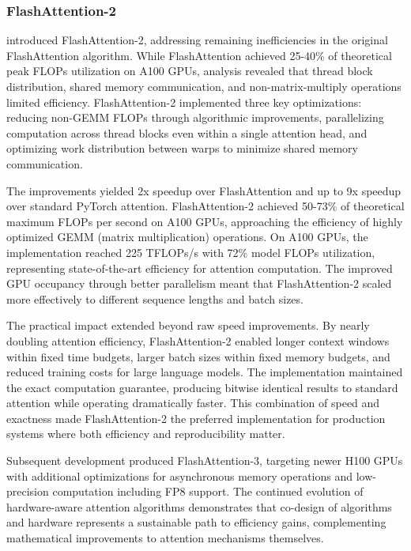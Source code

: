 \subsubsection{FlashAttention-2}

\citet{dao2023flashattention2} introduced FlashAttention-2, addressing remaining inefficiencies in the original FlashAttention algorithm. While FlashAttention achieved 25-40\% of theoretical peak FLOPs utilization on A100 GPUs, analysis revealed that thread block distribution, shared memory communication, and non-matrix-multiply operations limited efficiency. FlashAttention-2 implemented three key optimizations: reducing non-GEMM FLOPs through algorithmic improvements, parallelizing computation across thread blocks even within a single attention head, and optimizing work distribution between warps to minimize shared memory communication.

The improvements yielded 2x speedup over FlashAttention and up to 9x speedup over standard PyTorch attention. FlashAttention-2 achieved 50-73\% of theoretical maximum FLOPs per second on A100 GPUs, approaching the efficiency of highly optimized GEMM (matrix multiplication) operations. On A100 GPUs, the implementation reached 225 TFLOPs/s with 72\% model FLOPs utilization, representing state-of-the-art efficiency for attention computation. The improved GPU occupancy through better parallelism meant that FlashAttention-2 scaled more effectively to different sequence lengths and batch sizes.

The practical impact extended beyond raw speed improvements. By nearly doubling attention efficiency, FlashAttention-2 enabled longer context windows within fixed time budgets, larger batch sizes within fixed memory budgets, and reduced training costs for large language models. The implementation maintained the exact computation guarantee, producing bitwise identical results to standard attention while operating dramatically faster. This combination of speed and exactness made FlashAttention-2 the preferred implementation for production systems where both efficiency and reproducibility matter.

Subsequent development produced FlashAttention-3, targeting newer H100 GPUs with additional optimizations for asynchronous memory operations and low-precision computation including FP8 support. The continued evolution of hardware-aware attention algorithms demonstrates that co-design of algorithms and hardware represents a sustainable path to efficiency gains, complementing mathematical improvements to attention mechanisms themselves.

